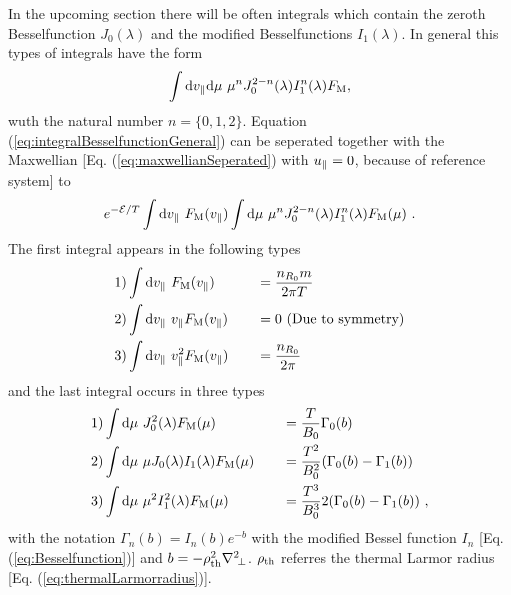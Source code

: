 In the upcoming section there will be often integrals which contain the zeroth Besselfunction $J_0(\lambda)$ and the modified Besselfunctions $I_1(\lambda)$. In general this types of integrals have the form
\begin{gather}
	\int \mathrm{d}v_\parallel\mathrm{d}\mu~ \mu^n J_0^{2-n}(\lambda) I_1^n(\lambda) F_\mathrm{M} ,
	\label{eq:integralBesselfunctionGeneral}
\end{gather}
wuth the natural number $n = \{0, 1, 2\}$. Equation (\ref{eq:integralBesselfunctionGeneral}) can be seperated together with the Maxwellian [Eq. (\ref{eq:maxwellianSeperated}) with $u_\parallel = 0$, because of reference system] to
\begin{gather}
	e^{-\mathcal{E}/T} \int \mathrm{d}v_\parallel ~ F_\mathrm{M}(v_\parallel) \int \mathrm{d}\mu ~ \mu^n J_0^{2-n}(\lambda) I_1^n(\lambda) F_\mathrm{M}(\mu) ~.
	\label{eq:integralBesselfunctionGeneralSperated}
\end{gather}
The first integral appears in the following types
\begin{gather}
	\begin{aligned}
		1)& \int \mathrm{d}v_\parallel ~         F_\mathrm{M}(v_\parallel) &\quad &= \frac{n_{R_0} m}{2\pi T} \\
		2)& \int \mathrm{d}v_\parallel ~ v_\parallel   F_\mathrm{M}(v_\parallel) &\quad &= 0 ~ \mathrm{(Due~to~symmetry)}\\
		3)& \int \mathrm{d}v_\parallel ~ v_\parallel^2 F_\mathrm{M}(v_\parallel) &\quad &= \frac{n_{R_0}}{2\pi} \\
	\end{aligned}
	\label{eq:integralMaxwellian}
\end{gather}
and the last integral occurs in three types
\begin{gather}
	\begin{aligned}
		1)& \int \mathrm{d}\mu ~ J_0^2(\lambda) F_\mathrm{M}(\mu) &\quad &= \frac{T}{B_0} \Gamma_0(b) \\
		2)& \int \mathrm{d}\mu ~ \mu J_0(\lambda) I_1(\lambda) F_\mathrm{M}(\mu) &\quad &= \frac{T^2}{B_0^2} (\Gamma_0(b) - \Gamma_1(b)) \\
		3)& \int \mathrm{d}\mu ~ \mu^2 I_1^2(\lambda) F_\mathrm{M}(\mu) &\quad &= \frac{T^3}{B_0^3} 2 (\Gamma_0(b) - \Gamma_1(b))~, \\
	\end{aligned}
	\label{eq:integralBesselfunction}
\end{gather}
with the notation $\Gamma_n(b) = I_n(b) e^{-b}$ with the modified Bessel function $I_n$ [Eq. (\ref{eq:Besselfunction})] and $b= - \rho_{\mathrm{th}}^2 \nabla^2\!_\perp$. $\rho_{\mathrm{th}}$ referres the thermal Larmor radius [Eq. (\ref{eq:thermalLarmorradius})]. \cite{Derivation}

\newpage

